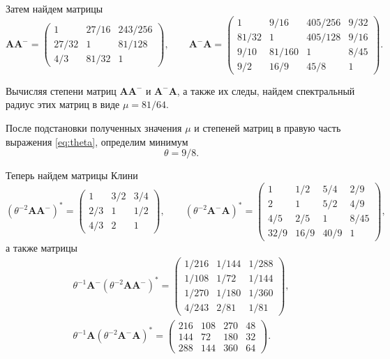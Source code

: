 \documentclass[specialist,
               substylefile = spbu.rtx,
               subf,href,colorlinks=true, 12pt]{disser}
\theoremstyle{definition}
\begin{document}
Затем найдем матрицы
\begin{equation*}
\bm{A}\bm{A}^{-}
=
\begin{pmatrix}
 1 & 27/16 & 243/256
\\
 27/32 & 1 & 81/128
\\
 4/3 & 81/32 & 1
\end{pmatrix},
\qquad
\bm{A}^{-}\bm{A}
=
\begin{pmatrix}
 1 & 9/16 & 405/256 & 9/32
\\
 81/32 & 1 & 405/128 & 9/16
\\
 9/10 & 81/160 & 1 & 8/45
\\
 9/2 & 16/9 & 45/8 & 1
\end{pmatrix}.
\end{equation*}

Вычисляя степени матриц $\bm{A}\bm{A}^{-}$ и $\bm{A}^{-}\bm{A}$, а также их следы, найдем спектральный радиус этих матриц в виде $\mu=81/64$.

После подстановки полученных значения $\mu$ и степеней матриц в правую часть выражения \eqref{eq:theta}, определим минимум 
\begin{equation*}
\theta
=
9/8.
\end{equation*}

Теперь найдем матрицы Клини
\begin{equation*}
(\theta^{-2}\bm{A}\bm{A}^{-})^{\ast}
=
\begin{pmatrix}
 1 & 3/2 & 3/4
\\
 2/3 & 1 & 1/2
\\
 4/3 & 2 & 1
\end{pmatrix},
\qquad
(\theta^{-2}\bm{A}^{-}\bm{A})^{\ast}
=
\begin{pmatrix}
 1 & 1/2 & 5/4 & 2/9
\\
 2 & 1 & 5/2 & 4/9
\\
 4/5 & 2/5 & 1 & 8/45
\\
 32/9 & 16/9 & 40/9 & 1
\end{pmatrix},
\end{equation*}
а также матрицы
\begin{gather*}
\theta^{-1}\bm{A}^{-}
(\theta^{-2}\bm{A}\bm{A}^{-})^{\ast}
=
\begin{pmatrix}
 1/216 & 1/144 & 1/288
\\
 1/108 & 1/72 & 1/144
\\
 1/270 & 1/180 & 1/360
\\
 4/243 & 2/81 & 1/81
\end{pmatrix},
\\
\theta^{-1}\bm{A}
(\theta^{-2}\bm{A}^{-}\bm{A})^{\ast}
=
\begin{pmatrix}
 216 & 108 & 270 & 48
\\
 144 & 72 & 180 & 32
\\
 288 & 144 & 360 & 64
\end{pmatrix}.
\end{gather*}
\end{document}
